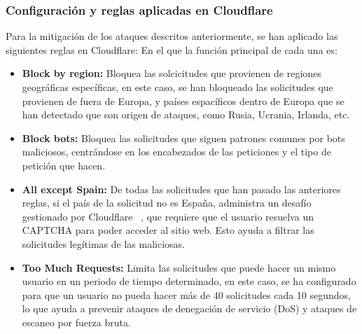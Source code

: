 \subsubsection{Configuración y reglas aplicadas en Cloudflare}
Para la mitigación de los ataques descritos anteriormente, se han aplicado las siguientes reglas en Cloudflare:
En el que la función principal de cada una es:
\begin{itemize}
    \item \textbf{Block by region:} Bloquea las solcicitudes que provienen de regiones geográficas específicas, en este caso, se han bloqueado las solicitudes que provienen de fuera de Europa, y países espacíficos dentro de Europa que se han detectado que son origen de ataques, como Rusia, Ucrania, Irlanda, etc.
    \item \textbf{Block bots:} Bloquea las solicitudes que siguen patrones comunes por bots maliciosos, centrándose en los encabezados de las peticiones y el tipo de petición que hacen.
    \item \textbf{All except Spain:} De todas las solicitudes que han pasado las anteriores reglas, si el país de la solicitud no es España, administra un desafío gestionado por Cloudflare ~\cite{CloudflareDocsTeam2025}, que requiere que el usuario resuelva un CAPTCHA para poder acceder al sitio web. Esto ayuda a filtrar las solicitudes legítimas de las maliciosas.
    \item \textbf{Too Much Requests:} Limita las solicitudes que puede hacer un mismo usuario en un periodo de tiempo determinado, en este caso, se ha configurado para que un usuario no pueda hacer más de 40 solicitudes cada 10 segundos, lo que ayuda a prevenir ataques de denegación de servicio (DoS) y ataques de escaneo por fuerza bruta.
\end{itemize}

